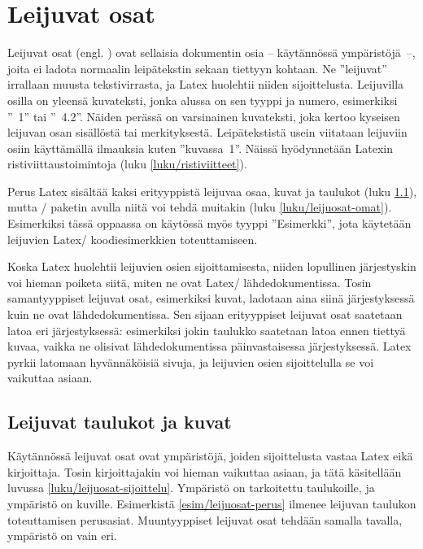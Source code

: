 \section{Leijuvat osat}
\label{luku/leijuosat}

Leijuvat osat (engl. ) ovat sellaisia dokumentin osia
-- käytännössä ympäristöjä~--, joita ei ladota normaalin leipätekstin
sekaan tiettyyn kohtaan. Ne ''leijuvat'' irrallaan muusta
tekstivirrasta, ja Latex huolehtii niiden sijoittelusta. Leijuvilla
osilla on yleensä kuvateksti, jonka alussa on sen tyyppi ja numero,
esimerkiksi ''\figurename~1'' tai ''\tablename\ 4.2''. Näiden perässä on
varsinainen kuvateksti, joka kertoo kyseisen leijuvan osan sisällöstä
tai merkityksestä. Leipätekstistä usein viitataan leijuviin osiin
käyttämällä ilmauksia kuten ''kuvassa~1''. Näissä hyödynnetään Latexin
ristiviittaustoimintoja (luku \ref{luku/ristiviitteet}).

Perus Latex sisältää kaksi erityyppistä leijuvaa osaa, kuvat ja taulukot
(luku \ref{luku/leijuosat-latex}), mutta \-/ paketin
avulla niitä voi tehdä muitakin (luku \ref{luku/leijuosat-omat}).
Esimerkiksi tässä oppaassa on käytössä myös tyyppi ''Esimerkki'', jota
käytetään leijuvien Latex\-/ koodiesimerkkien toteuttamiseen.

Koska Latex huolehtii leijuvien osien sijoittamisesta, niiden lopullinen
järjestyskin voi hieman poiketa siitä, miten ne ovat Latex\-/
lähdedokumentissa. Tosin samantyyppiset leijuvat osat, esimerkiksi
kuvat, ladotaan aina siinä järjestyksessä kuin ne ovat
lähdedokumentissa. Sen sijaan erityyppiset leijuvat osat saatetaan latoa
eri järjestyksessä: esimerkiksi jokin taulukko saatetaan latoa ennen
tiettyä kuvaa, vaikka ne olisivat lähdedokumentissa päinvastaisessa
järjestyksessä. Latex pyrkii latomaan hyvännäköisiä sivuja, ja leijuvien
osien sijoittelulla se voi vaikuttaa asiaan.

\subsection{Leijuvat taulukot ja kuvat}
\label{luku/leijuosat-latex}

Käytännössä leijuvat osat ovat ympäristöjä, joiden sijoittelusta vastaa
Latex eikä kirjoittaja. Tosin kirjoittajakin voi hieman vaikuttaa
asiaan, ja tätä käsitellään luvussa \ref{luku/leijuosat-sijoittelu}.
Ympäristö  on tarkoitettu taulukoille, ja ympäristö
 on kuville. Esimerkistä \ref{esim/leijuosat-perus}
ilmenee leijuvan taulukon toteuttamisen perusasiat. Muuntyyppiset
leijuvat osat tehdään samalla tavalla, ympäristö on vain eri.

